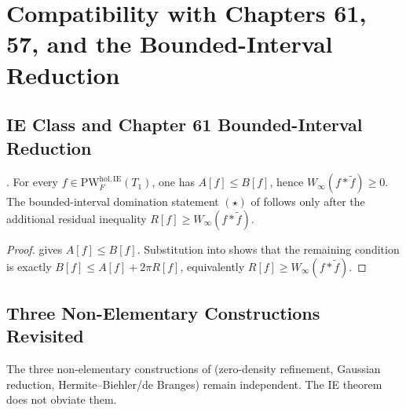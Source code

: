 \section{Compatibility with Chapters 61, 57, and the Bounded-Interval Reduction}
\label{v4-arith:w7-e:compatibility}

\subsection{IE Class and Chapter 61 Bounded-Interval Reduction}
\label{v4-arith:w7-e:compat-ch61}

\begin{proposition}
\label{v4-arith:w7-e:prop:compat-bounded}
\ClaimStatusProvedHere. For every \(f\in\mathrm{PW}^{\mathrm{hol},\mathrm{IE}}_{F}(T_{1})\),
one has \(A[f]\leq B[f]\), hence \(W_{\infty}(f*\widetilde f)\ge0\).
The bounded-interval domination statement \((\star)\) of
 follows only after the
additional residual inequality
\(R[f]\geq W_{\infty}(f*\widetilde f)\).
\end{proposition}

\begin{proof}
 gives \(A[f]\leq B[f]\). Substitution
into  shows that the remaining
condition is exactly \(B[f]\leq A[f]+2\pi R[f]\), equivalently
\(R[f]\geq W_{\infty}(f*\widetilde f)\).
\end{proof}

\subsection{Three Non-Elementary Constructions Revisited}
\label{v4-arith:w7-e:three-constructions}

The three non-elementary constructions of
 (zero-density refinement,
Gaussian reduction, Hermite--Biehler/de Branges) remain independent.
The IE theorem does not obviate them.

